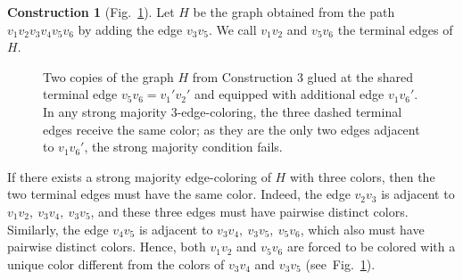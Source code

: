 \documentclass[11pt]{article}
\theoremstyle{definition}
\newtheorem{construction}{Construction}
\begin{document}
\begin{construction}[Fig.~\ref{fig.1}]\label{cons:3}
Let \(H\) be the graph obtained from the path $v_1v_2v_3v_4v_5v_6$ by adding the
edge \(v_3v_5\). We call \(v_1v_2\) and \(v_5v_6\) the terminal edges of \(H\).
\begin{figure}
\begin{center}
\caption{Two copies of the graph \(H\) from Construction 3 glued at the shared terminal edge \(v_5v_6=v_1'v_2'\) and equipped with additional edge \(v_1v_6'\). In any strong majority \(3\)-edge-coloring, the three dashed terminal edges receive the
same color; as they are the only two edges adjacent to \(v_1v_6'\), the strong majority condition fails.}\label{fig.1}
\end{center}
\end{figure}

If there exists a strong majority edge-coloring of \(H\) with three colors, then the two terminal edges must have the same color.  Indeed, the edge \(v_2v_3\) is adjacent to $v_1v_2,~v_3v_4,~v_3v_5$, and these three edges must have pairwise distinct colors. Similarly, the edge \(v_4v_5\) is adjacent to $v_3v_4,~v_3v_5,~ v_5v_6$, which also must have pairwise distinct colors.  Hence, both \(v_1v_2\) and \(v_5v_6\) are forced to be colored with a unique color different from the colors of \(v_3v_4\) and \(v_3v_5\) (see~Fig.~\ref{fig.1}).



\end{construction}
\end{document}
